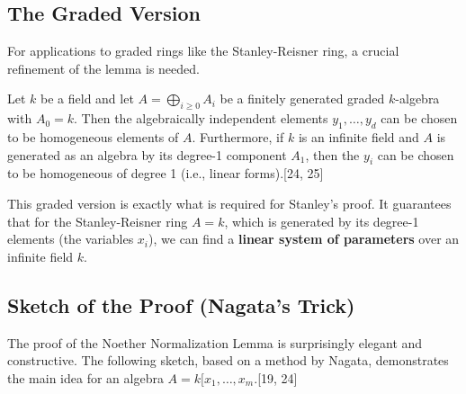 \documentclass[11pt]{article}
\begin{document}
\subsection{The Graded Version}

For applications to graded rings like the Stanley-Reisner ring, a crucial refinement of the lemma is needed.

\begin{theorem}
Let $k$ be a field and let $A = \bigoplus_{i \ge 0} A_i$ be a finitely generated graded $k$-algebra with $A_0=k$. Then the algebraically independent elements $y_1, \ldots, y_d$ can be chosen to be homogeneous elements of $A$. Furthermore, if $k$ is an infinite field and $A$ is generated as an algebra by its degree-1 component $A_1$, then the $y_i$ can be chosen to be homogeneous of degree 1 (i.e., linear forms).[24, 25]
\end{theorem}

This graded version is exactly what is required for Stanley's proof. It guarantees that for the Stanley-Reisner ring $A = k$, which is generated by its degree-1 elements (the variables $x_i$), we can find a \textbf{linear system of parameters} over an infinite field $k$.

\subsection{Sketch of the Proof (Nagata's Trick)}

The proof of the Noether Normalization Lemma is surprisingly elegant and constructive. The following sketch, based on a method by Nagata, demonstrates the main idea for an algebra $A = k[x_1, \ldots, x_m$.[19, 24]
\end{document}
